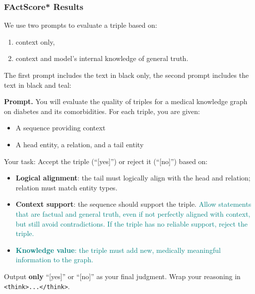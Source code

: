 \documentclass[10pt]{article}
\begin{document}
\subsubsection{FActScore* Results}
\label{subsubsec:factscore_results}

We use two prompts to evaluate a triple based on:
\begin{enumerate}
    \item context only,
    \item context and model's internal knowledge of general truth.
\end{enumerate}
The first prompt includes the text in black only, the second prompt includes the text in black and teal:

\begin{tcolorbox}[enhanced,colback=gray!5,colframe=gray!40,
                  left=6pt,right=6pt,top=6pt,bottom=6pt,boxsep=0pt]
\noindent\textbf{Prompt.} \small You will evaluate the quality of triples for a medical knowledge graph on diabetes and its comorbidities. For each triple, you are given:
        \begin{itemize}
            \item A sequence providing context
            \item A head entity, a relation, and a tail entity
        \end{itemize}
        Your task: Accept the triple (``[yes]'') or reject it (``[no]'') based on:
        \begin{itemize}
            \item \textbf{Logical alignment}: the tail must logically align with the head and relation; relation must match entity types.
            \item \textbf{Context support}: the sequence should support the triple. \textcolor{teal}{Allow statements that are factual and general truth, even if not perfectly aligned with context, but still avoid contradictions. If the triple has no reliable support, reject the triple.}
            \item \textcolor{teal}{\textbf{Knowledge value}: the triple must add new, medically meaningful information to the graph.}
        \end{itemize}
        Output \textbf{only} ``[yes]'' or ``[no]'' as your final judgment. Wrap your reasoning in \texttt{<think>...</think>}.
\end{tcolorbox}
\end{document}
